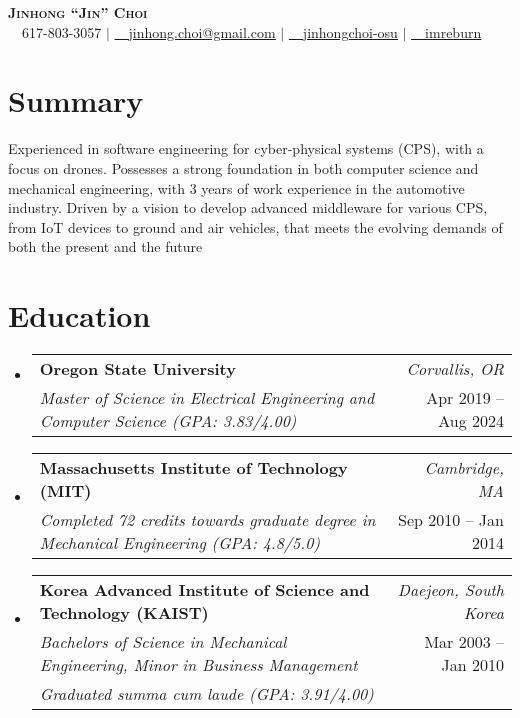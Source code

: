 \documentclass[letterpaper,10pt]{article}
\makeatletter
\newcommand{\resumeSubheadingNew}[4]{
  \vspace{-2pt}\item
    \begin{tabular*}{0.97\textwidth}[t]{l@{\extracolsep{\fill}}r}
      \textbf{#1} & \textit{\small #2} \\
      \textit{\small#3} & \small #4 \\
    \end{tabular*}\vspace{-6pt}
}
\newcommand{\resumeSubheadingNewLine}[5]{
  \vspace{-2pt}\item
    \begin{tabular*}{0.97\textwidth}[t]{l@{\extracolsep{\fill}}r}
      \textbf{#1} & \textit{\small #2} \\
      \textit{\small#3} & \small #4 \\
      \textit{\small#5} & \\
    \end{tabular*}\vspace{-6pt}
}
\newcommand{\resumeSubHeadingListStart}{\begin{itemize}[leftmargin=0.15in, label={}]}
\newcommand{\resumeSubHeadingListEnd}{\end{itemize}}
\makeatother
\begin{document}

\begin{center}
    \textbf{\Huge \scshape Jinhong ``Jin'' Choi} \\ \vspace{5pt}
    \small \faMobile~~617-803-3057 $|$ \href{mailto:jinhong.choi@gmail.com}{\faEnvelope~~\underline{jinhong.choi@gmail.com}} $|$ 
    \href{https://linkedin.com/in/jinhongchoi-osu}{\faLinkedin~~\underline{jinhongchoi-osu}} $|$
    \href{https://github.com/imreburn}{\faGithub~~\underline{imreburn}}
\end{center}

\section{Summary}
\begin{itemize}[leftmargin=0.15in, label={}, rightmargin=0.15in]
\small{\item{Experienced in software engineering for cyber-physical systems (CPS), with a focus on drones. Possesses a strong foundation in both computer science and mechanical engineering, with 3 years of work experience in the automotive industry. Driven by a vision to develop advanced middleware for various CPS, from IoT devices to ground and air vehicles, that meets the evolving demands of both the present and the future}}
\end{itemize}

\section{Education}
  \resumeSubHeadingListStart
    \resumeSubheadingNew
      {Oregon State University}{Corvallis, OR}
      {Master of Science in  Electrical Engineering and Computer Science (GPA: 3.83/4.00)}{Apr 2019 -- Aug 2024}
    \resumeSubheadingNew
      {Massachusetts Institute of Technology (MIT)}{Cambridge, MA}
      {Completed 72 credits towards graduate degree in Mechanical Engineering (GPA: 4.8/5.0)}{Sep 2010 -- Jan 2014}
    \resumeSubheadingNewLine
      {Korea Advanced Institute of Science and Technology (KAIST)}{Daejeon, South Korea}
      {Bachelors of Science in Mechanical Engineering, Minor in Business Management}{Mar 2003 -- Jan 2010}{Graduated summa cum laude (GPA: 3.91/4.00)}
  \resumeSubHeadingListEnd
\end{document}
